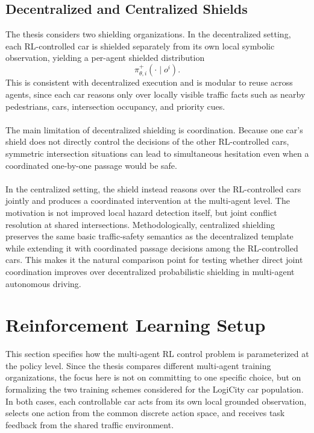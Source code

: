\subsection{Decentralized and Centralized Shields}
The thesis considers two shielding organizations. In the decentralized setting, each RL-controlled car is shielded separately from its own local symbolic observation, yielding a per-agent shielded distribution
\[
\pi_{\theta,i}^+(\cdot\mid o^i).
\]
\noindent This is consistent with decentralized execution and is modular to reuse across agents, since each car reasons only over locally visible traffic facts such as nearby pedestrians, cars, intersection occupancy, and priority cues.
\\
\\
The main limitation of decentralized shielding is coordination. Because one car's shield does not directly control the decisions of the other RL-controlled cars, symmetric intersection situations can lead to simultaneous hesitation even when a coordinated one-by-one passage would be safe.
\\
\\
In the centralized setting, the shield instead reasons over the RL-controlled cars jointly and produces a coordinated intervention at the multi-agent level. The motivation is not improved local hazard detection itself, but joint conflict resolution at shared intersections. Methodologically, centralized shielding preserves the same basic traffic-safety semantics as the decentralized template while extending it with coordinated passage decisions among the RL-controlled cars. This makes it the natural comparison point for testing whether direct joint coordination improves over decentralized probabilistic shielding in multi-agent autonomous driving.

\section{Reinforcement Learning Setup}
This section specifies how the multi-agent RL control problem is parameterized at the policy level. Since the thesis compares different multi-agent training organizations, the focus here is not on committing to one specific choice, but on formalizing the two training schemes considered for the LogiCity car population. In both cases, each controllable car acts from its own local grounded observation, selects one action from the common discrete action space, and receives task feedback from the shared traffic environment.

